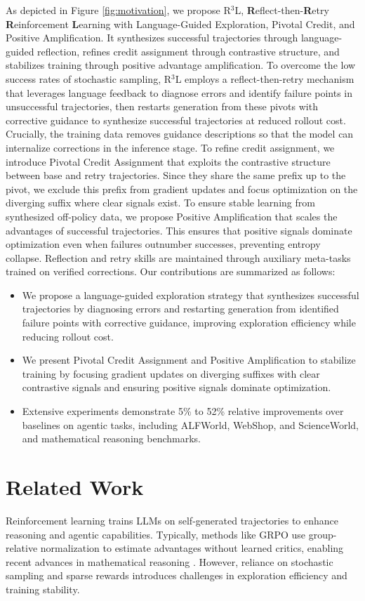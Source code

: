 \documentclass{article} %
\theoremstyle{definition}
\theoremstyle{remark}
\let\cite\citep
\begin{document}
As depicted in Figure \ref{fig:motivation}, we propose R$^3$L, \textbf{R}eflect-then-\textbf{R}etry \textbf{R}einforcement \textbf{L}earning with Language-Guided Exploration, Pivotal Credit, and Positive Amplification. It synthesizes successful trajectories through language-guided reflection, refines credit assignment through contrastive structure, and stabilizes training through positive advantage amplification. To overcome the low success rates of stochastic sampling, R$^3$L employs a reflect-then-retry mechanism that leverages language feedback to diagnose errors and identify failure points in unsuccessful trajectories, then restarts generation from these pivots with corrective guidance to synthesize successful trajectories at reduced rollout cost. Crucially, the training data removes guidance descriptions so that the model can internalize corrections in the inference stage. To refine credit assignment, we introduce Pivotal Credit Assignment that exploits the contrastive structure between base and retry trajectories. Since they share the same prefix up to the pivot, we exclude this prefix from gradient updates and focus optimization on the diverging suffix where clear signals exist. To ensure stable learning from synthesized off-policy data, we propose Positive Amplification that scales the advantages of successful trajectories. This ensures that positive signals dominate optimization even when failures outnumber successes, preventing entropy collapse. Reflection and retry skills are maintained through auxiliary meta-tasks trained on verified corrections. Our contributions are summarized as follows:
\begin{itemize}
\item We propose a language-guided exploration strategy that synthesizes successful trajectories by diagnosing errors and restarting generation from identified failure points with corrective guidance, improving exploration efficiency while reducing rollout cost.
\item We present Pivotal Credit Assignment and Positive Amplification to stabilize training by focusing gradient updates on diverging suffixes with clear contrastive signals and ensuring positive signals dominate optimization.
\item Extensive experiments demonstrate 5\% to 52\% relative improvements over baselines on agentic tasks, including ALFWorld, WebShop, and ScienceWorld, and mathematical reasoning benchmarks.
\end{itemize}

\section{Related Work}
\label{sec:related_work}
Reinforcement learning trains LLMs on self-generated trajectories to enhance reasoning and agentic capabilities. Typically, methods like GRPO \cite{shao2024deepseekmath} use group-relative normalization to estimate advantages without learned critics, enabling recent advances in mathematical reasoning \cite{guo2025deepseek}. However, reliance on stochastic sampling and sparse rewards introduces challenges in exploration efficiency and training stability.
\end{document}
